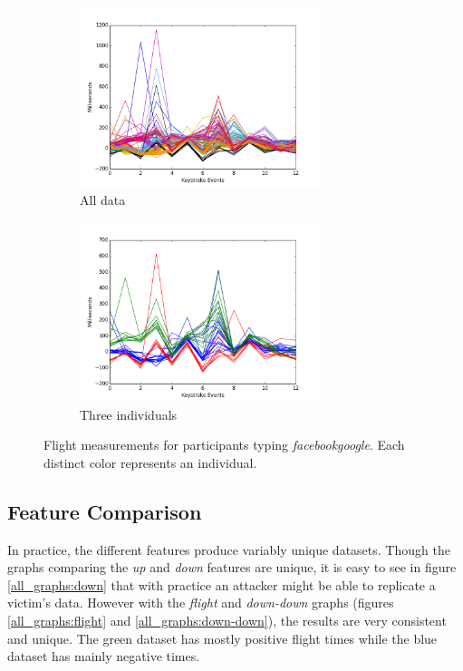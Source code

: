 \documentclass{article}
\begin{document}
\begin{figure}[H]
  \begin{subfigure}[b]{75mm}
    \centering
    \includegraphics[width=70mm]{facebookgoogle_flight_final.png}
    \caption{All data}
    \label{full_facebookgoogle_flight}
  \end{subfigure}
  \begin{subfigure}[b]{75mm}
    \centering
    \includegraphics[width=70mm]{facebookgoogle_multi_flight_final.png}
    \caption{Three individuals}
    \label{multi_facebookgoogle_flight}
  \end{subfigure}
  \caption{Flight measurements for participants typing \textit{facebookgoogle}. Each distinct color represents an individual.}
\end{figure}

\subsection{Feature Comparison} 

In practice, the different features produce variably unique datasets. Though the graphs comparing the \textit{up} and \textit{down} features are unique, it is easy to see in figure \ref{all_graphs:down} that with practice an attacker might be able to replicate a victim's data. However with the \textit{flight} and \textit{down-down} graphs (figures \ref{all_graphs:flight} and \ref{all_graphs:down-down}), the results are very consistent and unique. The green dataset has mostly positive flight times while the blue dataset has mainly negative times.
\end{document}
